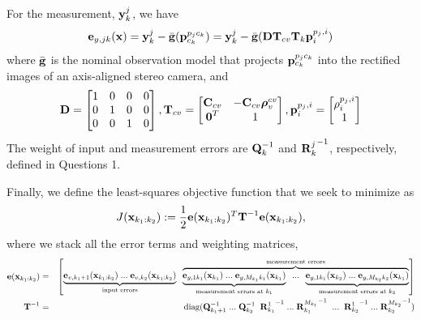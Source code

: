 \documentclass[a4paper]{article}
\begin{document}
For the measurement, $\bm{\mathbf{y}}^j_k$, we have
\begin{equation}
    \bm{\mathbf{e}}_{y, jk}(\bm{\mathbf{x}}) = \bm{\mathbf{y}}^j_k - \bar{\bm{\mathbf{g}}}(\bm{\mathbf{p}}_{c_k}^{p_j c_k}) = \bm{\mathbf{y}}^j_k - \bar{\bm{\mathbf{g}}}(\bm{\mathbf{D}} \bm{\mathbf{T}}_{cv} \bm{\mathbf{T}}_{k}\bm{\mathbf{p}}_i^{p_j, i})
\end{equation}
where $\bar{\bm{\mathbf{g}}}$ is the nominal observation model that projects $\bm{\mathbf{p}}_{c_k}^{p_j c_k}$ into the rectified images of an axis-aligned stereo camera, and 
\begin{eqnarray}
    \bm{\mathbf{D}} = \begin{bmatrix}
      1 & 0 & 0 & 0 \\ 0 & 1 & 0 & 0 \\ 0 & 0 & 1 & 0 
    \end{bmatrix}, 
    \bm{\mathbf{T}}_{cv} = \begin{bmatrix}
      \bm{\mathbf{C}}_{cv} & -\bm{\mathbf{C}}_{cv}\bm{\mathbf{\rho}}_v^{cv} \\ \bm{\mathbf{0}}^T & 1
    \end{bmatrix},
    \bm{\mathbf{p}}_i^{p_j, i} = \begin{bmatrix}
      \rho_i^{p_j, i} \\ 1
    \end{bmatrix}
\end{eqnarray}
The weight of input and measurement errors are $\bm{\mathbf{Q}}_k^{-1}$ and ${\bm{\mathbf{R}}^j_k}^{-1}$, respectively, defined in Questions 1.

Finally, we define the least-squares objective function that we seek to minimize as
\begin{equation}
    J(\bm{\mathbf{x}}_{k_1: k_2}) := \dfrac{1}{2} \bm{\mathbf{e}}(\bm{\mathbf{x}}_{k_1: k_2})^T \bm{\mathbf{T}}^{-1} \bm{\mathbf{e}}(\bm{\mathbf{x}}_{k_1: k_2}),
\end{equation}
where we stack all the error terms and weighting matrices,
\begin{eqnarray*}
    \bm{\mathbf{e}}(\bm{\mathbf{x}}_{k_1:k_2}) &=& \begin{bmatrix}
      \underbrace{\bm{\mathbf{e}}_{v, k_1+1}(\bm{\mathbf{x}}_{k_1:k_2})\; ...\;\bm{\mathbf{e}}_{v, k_2}(\bm{\mathbf{x}}_{k_1:k_2})}_{\text{input errors}} \;\;
      \overbrace{\underbrace{\bm{\mathbf{e}}_{y,1 k_1}(\bm{\mathbf{x}}_{k_1})\;...\;\bm{\mathbf{e}}_{y,M_{k_1} k_1}(\bm{\mathbf{x}}_{k_1})}_{\text{measurement errors at } k_1} \;\; ... \;\; \underbrace{\bm{\mathbf{e}}_{y,1 k_1}(\bm{\mathbf{x}}_{k_2})\;...\;\bm{\mathbf{e}}_{y,M_{k_2} k_2}(\bm{\mathbf{x}}_{k_1})}_{\text{measurement errors at } k_2}}^{\text{measurement errors}}
    \end{bmatrix}\\
    \bm{\mathbf{T}}^{-1} &=& \text{diag}(
      \bm{\mathbf{Q}}_{k_1+1}^{-1}\; ...\; \bm{\mathbf{Q}}_{k_2}^{-1} \;\; {\bm{\mathbf{R}}_{k_1}^{1}}^{-1}\;...\;{\bm{\mathbf{R}}_{k_1}^{M_{k_1}}}^{-1}\;\;...\;\;{\bm{\mathbf{R}}_{k_2}^{1}}^{-1}\;...\;{\bm{\mathbf{R}}_{k_2}^{M_{k_2}}}^{-1}
    )
\end{eqnarray*}
\end{document}
